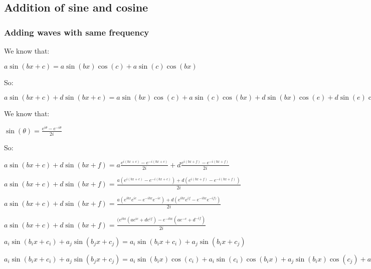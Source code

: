 
\subsection{Addition of sine and cosine}

\subsubsection{Adding waves with same frequency}

We know that:

$a\sin(bx+c)=a\sin(bx)\cos(c)+a\sin(c)\cos(bx)$

So:

$a\sin(bx+c)+d\sin(bx+e)=a\sin(bx)\cos(c)+a\sin(c)\cos(bx)+ d\sin(bx)\cos(e)+d\sin(e)\cos(bx)$

We know that:

$\sin(\theta )=\frac{e^{i\theta }-e^{-i\theta }}{2i}$

So:

$a\sin(bx+c)+d\sin(bx+f)=a\frac{e^{i(bx+c)}-e^{-i(bx+c)}}{2i}+d\frac{e^{i(bx+f)}-e^{-i(bx+f)}}{2i}$

$a\sin(bx+c)+d\sin(bx+f)=\frac{a(e^{i(bx+c)}-e^{-i(bx+c)})+d(e^{i(bx+f)}-e^{-i(bx+f)})}{2i}$

$a\sin(bx+c)+d\sin(bx+f)=\frac{a(e^{ibx}e^{ic}-e^{-ibx}e^{-ic})+d(e^{ibx}e^{if}-e^{-ibx}e^{-if)})}{2i}$

$a\sin(bx+c)+d\sin(bx+f)=\frac{(e^{ibx}(ae^{ic}+de^{if})-e^{-ibx}(ae^{-c}+d^{-if})}{2i}$

$a_i\sin(b_ix+c_i)+a_j\sin(b_jx+c_j)=a_i\sin(b_ix+c_i)+a_j\sin(b_ix+c_j)$

$a_i\sin(b_ix+c_i)+a_j\sin(b_jx+c_j)=a_i\sin(b_ix)\cos(c_i)+a_i\sin(c_i)\cos(b_ix)+a_j\sin(b_ix)\cos(c_j)+a_j\sin(c_j)\cos(b_ix)$

